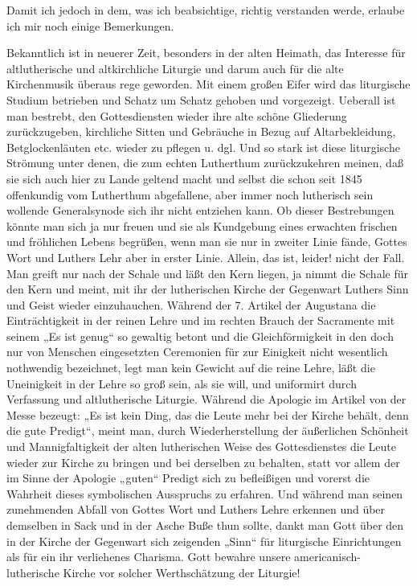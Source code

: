 Damit ich jedoch in dem, was ich beabsichtige, richtig verstanden werde, erlaube ich mir noch einige Bemerkungen.

Bekanntlich ist in neuerer Zeit, besonders in der alten Heimath, das Interesse für altlutherische und altkirchliche Liturgie und darum auch für die alte Kirchenmusik überaus rege geworden. Mit einem großen Eifer wird das liturgische Studium betrieben und Schatz um Schatz gehoben und vorgezeigt. Ueberall ist man bestrebt, den Gottesdiensten wieder ihre alte schöne Gliederung zurückzugeben, kirchliche Sitten und Gebräuche in Bezug auf Altarbekleidung, Betglockenläuten etc. wieder zu pflegen u. dgl. Und so stark ist diese liturgische Strömung unter denen, die zum echten Lutherthum zurückzukehren meinen, daß sie sich auch hier zu Lande geltend macht und selbst die schon seit 1845 offenkundig vom Lutherthum abgefallene, aber immer noch lutherisch sein wollende Generalsynode sich ihr nicht entziehen kann. Ob dieser Bestrebungen könnte man sich ja nur freuen und sie als Kundgebung eines erwachten frischen und fröhlichen Lebens begrüßen, wenn man sie nur in zweiter Linie fände, Gottes Wort und Luthers Lehr aber in erster Linie. Allein, das ist, leider! nicht der Fall. Man greift nur nach der Schale und läßt den Kern liegen, ja nimmt die Schale für den Kern und meint, mit ihr der lutherischen Kirche der Gegenwart Luthers Sinn und Geist wieder einzuhauchen. Während der 7. Artikel der Augustana die Einträchtigkeit in der reinen Lehre und im rechten Brauch der Sacramente mit seinem „Es ist genug“ so gewaltig betont und die Gleichförmigkeit in den doch nur von Menschen eingesetzten Ceremonien für zur Einigkeit nicht wesentlich nothwendig bezeichnet, legt man kein Gewicht auf die reine Lehre, läßt die Uneinigkeit in der Lehre so groß sein, als sie will, und uniformirt durch Verfassung und altlutherische Liturgie. Während die Apologie im Artikel von der Messe bezeugt: „Es ist kein Ding, das die Leute mehr bei der Kirche behält, denn die gute Predigt“, meint man, durch Wiederherstellung der äußerlichen Schönheit und Mannigfaltigkeit der alten lutherischen Weise des Gottesdienstes die Leute wieder zur Kirche zu bringen und bei derselben zu behalten, statt vor allem der im Sinne der Apologie „guten“ Predigt sich zu befleißigen und vorerst die Wahrheit dieses symbolischen Ausspruchs zu erfahren. Und während man seinen zunehmenden Abfall von Gottes Wort
und Luthers Lehre erkennen und über demselben in Sack und in der Asche Buße thun sollte, dankt man Gott über den in der Kirche der Gegenwart sich zeigenden „Sinn“ für liturgische Einrichtungen als für ein ihr verliehenes Charisma. Gott bewahre unsere americanisch-lutherische Kirche vor solcher Werthschätzung der Liturgie!

